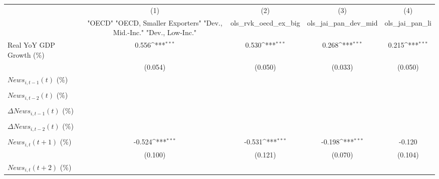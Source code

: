 {
\def\sym#1{\ifmmode^{#1}\else\(^{#1}\)\fi}
\begin{tabular}{l*{4}{c}}
\toprule
                    &\multicolumn{1}{c}{(1)}&\multicolumn{1}{c}{(2)}&\multicolumn{1}{c}{(3)}&\multicolumn{1}{c}{(4)}\\
                    &\multicolumn{1}{c}{ "OECD" "OECD, Smaller Exporters" "Dev., Mid.-Inc." "Dev., Low-Inc."}&\multicolumn{1}{c}{ols_rvk_oecd_ex_big}&\multicolumn{1}{c}{ols_jai_pan_dev_mid}&\multicolumn{1}{c}{ols_jai_pan_li}\\
\midrule
Real YoY GDP Growth (\%)&       0.556\sym{***}&       0.530\sym{***}&       0.268\sym{***}&       0.215\sym{***}\\
                    &     (0.054)         &     (0.050)         &     (0.033)         &     (0.050)         \\
\addlinespace
$ News_{i,t-1}(t)$ (\%)&                     &                     &                     &                     \\
                    &                     &                     &                     &                     \\
\addlinespace
$ News_{i,t-2}(t)$ (\%)&                     &                     &                     &                     \\
                    &                     &                     &                     &                     \\
\addlinespace
$ \Delta News_{i,t-1}(t)$ (\%)&                     &                     &                     &                     \\
                    &                     &                     &                     &                     \\
\addlinespace
$ \Delta News_{i,t-2}(t)$ (\%)&                     &                     &                     &                     \\
                    &                     &                     &                     &                     \\
\addlinespace
$ News_{i,t}(t+1)$ (\%)&      -0.524\sym{***}&      -0.531\sym{***}&      -0.198\sym{***}&      -0.120         \\
                    &     (0.100)         &     (0.121)         &     (0.070)         &     (0.104)         \\
\addlinespace
$ News_{i,t}(t+2)$ (\%)&                     &                     &                     &                     \\

\end{tabular}}
